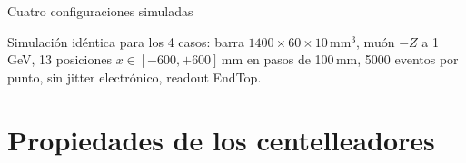 \documentclass[aspectratio=169,10pt]{beamer}
\begin{document}
\begin{frame}{Cuatro configuraciones simuladas}
\begin{center}
\end{center}

\vspace{0.3em}
{\footnotesize
Simulación idéntica para los 4 casos: barra $1400\times60\times10$\,mm$^3$,
muón $-Z$ a 1\,GeV, 13 posiciones $x\in[-600,+600]$\,mm en pasos de 100\,mm,
5000 eventos por punto, sin jitter electrónico, readout EndTop.}
\end{frame}

\section{Propiedades de los centelleadores}
\end{document}
